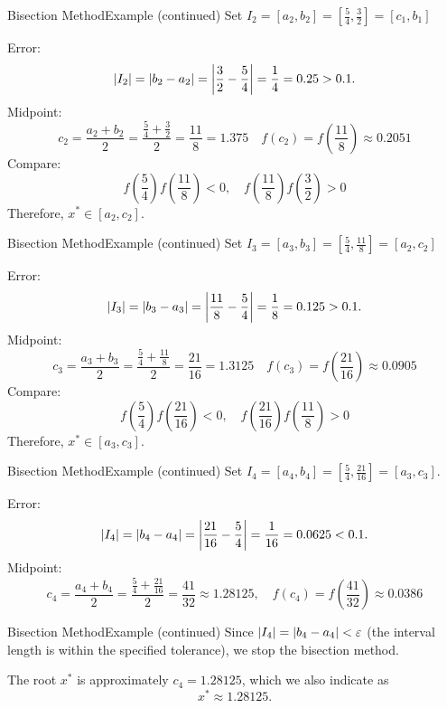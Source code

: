 \documentclass[12pt,aspectratio=169,envcountset]{beamer}
\DeclarePairedDelimiter{\abs}{\lvert}{\rvert}
\begin{document}
\begin{frame}{Bisection Method}{Example (continued)}
  Set $I_2 = [a_2, b_2] = \left[\frac{5}{4}, \frac{3}{2}\right] = [c_1, b_1]$

  Error:
  \[
    \abs{I_2} = \abs{b_2 - a_2}
    = \abs*{\frac{3}{2} - \frac{5}{4}}
    = \frac{1}{4}
    = 0.25 
    > 0.1.
  \]
  Midpoint:
  \[
    c_2 = \frac{a_2 + b_2}{2}
    = \frac{\frac{5}{4} + \frac{3}{2}}{2}
    = \frac{11}{8}
    = 1.375
    \quad
    f(c_2) = f\!\left(\frac{11}{8}\right) \approx 0.2051
  \]
  Compare:
  \[
    f\!\left(\frac{5}{4}\right)f\!\left(\frac{11}{8}\right) < 0, \quad
    f\!\left(\frac{11}{8}\right)f\!\left(\frac{3}{2}\right) > 0
  \]
  Therefore, $x^* \in [a_2, c_2]$.
\end{frame}

\begin{frame}{Bisection Method}{Example (continued)}
  Set $I_3 = [a_3, b_3] = \left[\frac{5}{4}, \frac{11}{8}\right] = [a_2, c_2]$

  Error:
  \[
    \abs{I_3} = \abs{b_3 - a_3}
    = \abs*{\frac{11}{8} - \frac{5}{4}}
    = \frac{1}{8}
    = 0.125 
    > 0.1.
  \]
  Midpoint:
  \[
    c_3 = \frac{a_3 + b_3}{2}
    = \frac{\frac{5}{4} + \frac{11}{8}}{2}
    = \frac{21}{16}
    = 1.3125
    \quad
    f(c_3) = f\!\left(\frac{21}{16}\right) \approx 0.0905
  \]
  Compare:
  \[
    f\!\left(\frac{5}{4}\right)f\!\left(\frac{21}{16}\right) < 0, \quad
    f\!\left(\frac{21}{16}\right)f\!\left(\frac{11}{8}\right) > 0
  \]
  Therefore, $x^* \in [a_3, c_3]$.
\end{frame}

\begin{frame}{Bisection Method}{Example (continued)}
  Set $I_4 = [a_4, b_4] = \left[\frac{5}{4}, \frac{21}{16}\right] = [a_3, c_3]$.

  Error:
  \[
    \abs{I_4} = \abs{b_4 - a_4}
    = \abs*{\frac{21}{16} - \frac{5}{4}}
    = \frac{1}{16}
    = 0.0625
    < 0.1.
  \]
  Midpoint:
  \[
    c_4 = \frac{a_4 + b_4}{2}
    = \frac{\frac{5}{4} + \frac{21}{16}}{2}
    = \frac{41}{32}
    \approx 1.28125, \quad
    f(c_4) = f\!\left(\frac{41}{32}\right) \approx 0.0386
  \]
\end{frame}

\begin{frame}{Bisection Method}{Example (continued)}
  Since $\abs{I_4} = \abs{b_4 - a_4} < \varepsilon$ (the interval length is
  within the specified tolerance), we stop the bisection method.

  The root $x^*$ is approximately $c_4 = 1.28125$, which we also indicate as
  \[
    x^* \approx 1.28125.
  \]
\end{frame}
\end{document}
